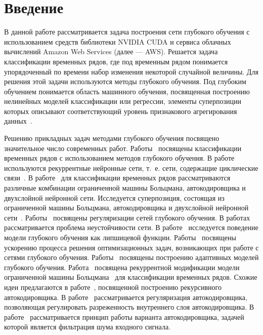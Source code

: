 \documentclass[12pt,notitlepage]{article}
\begin{document}
\section{Введение}
В данной работе рассматривается задача построения сети глубокого обучения с использованием средств библиотеки NVIDIA CUDA и сервиса облачных вычислений Amazon Web Services (далее --- AWS). Решается задача классификации временных рядов, где
под временным рядом понимается упорядоченный по времени набор изменения некоторой случайной величины. Для решения этой задачи используются методы глубокого обучения. Под глубоким обучением понимается область машинного обучения, посвященная построению нелинейных моделей классификации или регрессии, элементы суперпозиции которых описывают соответствующий уровень признакового агрегирования данных~\cite{foundamentals}.

Решению прикладных задач методами глубокого обучения посвящено значительное число современных работ. Работы~\cite{ts1,ts2,ts3} посвящены классификации временных рядов с использованием методов глубокого обучения. В работе~\cite{ts2} используются рекуррентные нейронные сети, т.~е. сети, содержащие циклические связи~\cite{foundamentals}. В работе~\cite{ts3} для классификации временных рядов рассматриваются различные комбинации ограниченной машины Больцмана, автокодировщика и двухслойной нейронной сети. Исследуется суперпозиция, состоящая из ограниченной машины Больцмана, автокодировщика и двухслойной нейронной сети~\cite{foundamentals}. Работы~\cite{reg1,reg2,reg3,reg4} посвящены регуляризации сетей глубокого обучения. В работах~\cite{stab1,stab2} рассматривается проблема неустойчивости сети. В работе~\cite{stab1} исследуется поведение модели глубокого обучения как липшицевой функции. Работы~\cite{speed1,speed2,speed3} посвящены ускорению процесса решения оптимизационных задач, возникающих при работе с сетями глубокого обучения. Работы~\cite{stab2, ada} посвящены построению адаптивных моделей глубокого обучения. Работа~\cite{recrbm} посвящена рекуррентной модификации модели ограниченной машины Больцмана~\cite{rbm} для классификации временных рядов. Схожие идеи предлагаются в работе~\cite{rae}, посвященной построению рекурсивного автокодировщика. В работе~\cite{sparse} рассматривается регуляризация автокодировщика, позволяющая регулировать разреженность внутреннего слоя автокодировщика. В работе~\cite{denoise} рассматривается принцип работы варианта автокодировщика, задачей которой является фильтрация шума входного сигнала.
\end{document}
